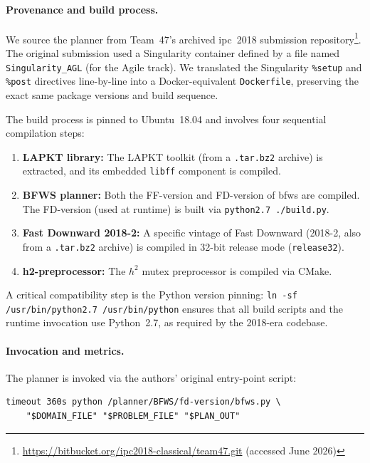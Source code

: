 \paragraph{Provenance and build process.}
We source the planner from Team~47's archived \gls{ipc}~2018 submission repository\footnote{\url{https://bitbucket.org/ipc2018-classical/team47.git} (accessed June 2026)}.
The original submission used a Singularity container defined by a file named \texttt{Singularity\_AGL} (for the Agile track).
We translated the Singularity \texttt{\%setup} and \texttt{\%post} directives line-by-line into a Docker-equivalent \texttt{Dockerfile}, preserving the exact same package versions and build sequence.

The build process is pinned to Ubuntu~18.04 and involves four sequential compilation steps:

\begin{enumerate}
  \item \textbf{LAPKT library:} The LAPKT toolkit (from a \texttt{.tar.bz2} archive) is extracted, and its embedded \texttt{libff} component is compiled.
  \item \textbf{BFWS planner:} Both the FF-version and FD-version of \gls{bfws} are compiled. The FD-version (used at runtime) is built via \texttt{python2.7 ./build.py}.
  \item \textbf{Fast Downward 2018-2:} A specific vintage of Fast Downward (2018-2, also from a \texttt{.tar.bz2} archive) is compiled in 32-bit release mode (\texttt{release32}).
  \item \textbf{h2-preprocessor:} The $h^2$ mutex preprocessor is compiled via CMake.
\end{enumerate}

A critical compatibility step is the Python version pinning: \texttt{ln -sf /usr/bin/python2.7 /usr/bin/python} ensures that all build scripts and the runtime invocation use Python~2.7, as required by the 2018-era codebase.

\paragraph{Invocation and metrics.}
The planner is invoked via the authors' original entry-point script:
\begin{lstlisting}[language={}, basicstyle=\small\ttfamily, numbers=none, frame=none, xleftmargin=0.5cm, breaklines=true]
timeout 360s python /planner/BFWS/fd-version/bfws.py \
    "$DOMAIN_FILE" "$PROBLEM_FILE" "$PLAN_OUT"
\end{lstlisting}

